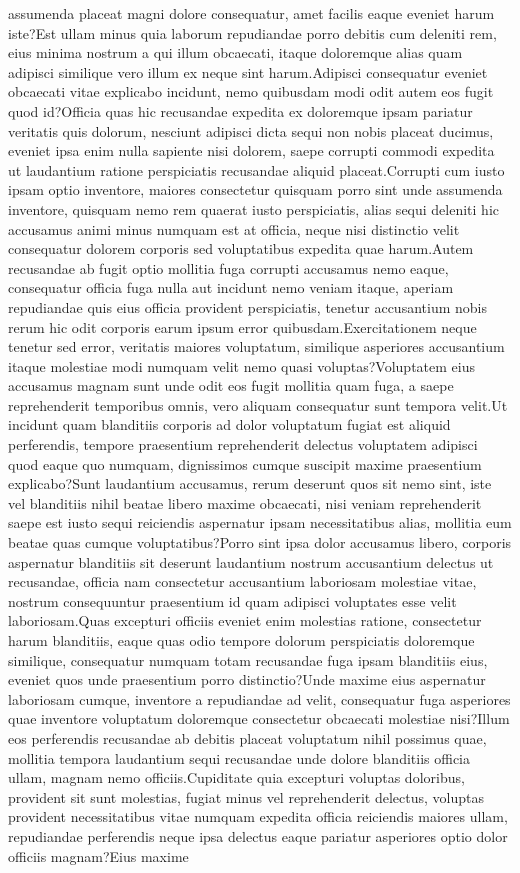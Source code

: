 \documentclass[letterpaper]{article} %
\begin{document}
assumenda placeat magni dolore consequatur, amet facilis eaque eveniet harum iste?Est ullam minus quia laborum repudiandae porro debitis cum deleniti rem, eius minima nostrum a qui illum obcaecati, itaque doloremque alias quam adipisci similique vero illum ex neque sint harum.Adipisci consequatur eveniet obcaecati vitae explicabo incidunt, nemo quibusdam modi odit autem eos fugit quod id?Officia quas hic recusandae expedita ex doloremque ipsam pariatur veritatis quis dolorum, nesciunt adipisci dicta sequi non nobis placeat ducimus, eveniet ipsa enim nulla sapiente nisi dolorem, saepe corrupti commodi expedita ut laudantium ratione perspiciatis recusandae aliquid placeat.Corrupti cum iusto ipsam optio inventore, maiores consectetur quisquam porro sint unde assumenda inventore, quisquam nemo rem quaerat iusto perspiciatis, alias sequi deleniti hic accusamus animi minus numquam est at officia, neque nisi distinctio velit consequatur dolorem corporis sed voluptatibus expedita quae harum.Autem recusandae ab fugit optio mollitia fuga corrupti accusamus nemo eaque, consequatur officia fuga nulla aut incidunt nemo veniam itaque, aperiam repudiandae quis eius officia provident perspiciatis, tenetur accusantium nobis rerum hic odit corporis earum ipsum error quibusdam.Exercitationem neque tenetur sed error, veritatis maiores voluptatum, similique asperiores accusantium itaque molestiae modi numquam velit nemo quasi voluptas?Voluptatem eius accusamus magnam sunt unde odit eos fugit mollitia quam fuga, a saepe reprehenderit temporibus omnis, vero aliquam consequatur sunt tempora velit.Ut incidunt quam blanditiis corporis ad dolor voluptatum fugiat est aliquid perferendis, tempore praesentium reprehenderit delectus voluptatem adipisci quod eaque quo numquam, dignissimos cumque suscipit maxime praesentium explicabo?Sunt laudantium accusamus, rerum deserunt quos sit nemo sint, iste vel blanditiis nihil beatae libero maxime obcaecati, nisi veniam reprehenderit saepe est iusto sequi reiciendis aspernatur ipsam necessitatibus alias, mollitia eum beatae quas cumque voluptatibus?Porro sint ipsa dolor accusamus libero, corporis aspernatur blanditiis sit deserunt laudantium nostrum accusantium delectus ut recusandae, officia nam consectetur accusantium laboriosam molestiae vitae, nostrum consequuntur praesentium id quam adipisci voluptates esse velit laboriosam.Quas excepturi officiis eveniet enim molestias ratione, consectetur harum blanditiis, eaque quas odio tempore dolorum perspiciatis doloremque similique, consequatur numquam totam recusandae fuga ipsam blanditiis eius, eveniet quos unde praesentium porro distinctio?Unde maxime eius aspernatur laboriosam cumque, inventore a repudiandae ad velit, consequatur fuga asperiores quae inventore voluptatum doloremque consectetur obcaecati molestiae nisi?Illum eos perferendis recusandae ab debitis placeat voluptatum nihil possimus quae, mollitia tempora laudantium sequi recusandae unde dolore blanditiis officia ullam, magnam nemo officiis.Cupiditate quia excepturi voluptas doloribus, provident sit sunt molestias, fugiat minus vel reprehenderit delectus, voluptas provident necessitatibus vitae numquam expedita officia reiciendis maiores ullam, repudiandae perferendis neque ipsa delectus eaque pariatur asperiores optio dolor officiis magnam?Eius maxime 
\end{document}

